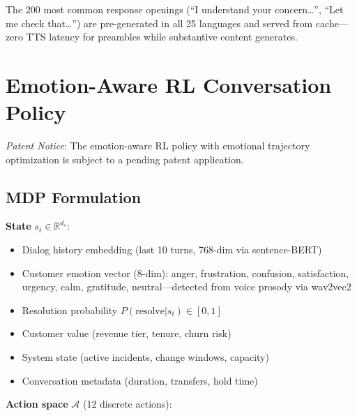 \documentclass[conference,10pt]{IEEEtran}
\begin{document}
The 200 most common response openings (``I understand your concern\ldots'', ``Let me check that\ldots'') are pre-generated in all 25 languages and served from cache---zero TTS latency for preambles while substantive content generates.

\section{Emotion-Aware RL Conversation Policy}
\label{sec:rl}

\emph{Patent Notice}: The emotion-aware RL policy with emotional trajectory optimization is subject to a pending patent application.

\subsection{MDP Formulation}

\textbf{State} $s_t \in \mathbb{R}^{d_s}$:
\begin{itemize}
\item Dialog history embedding (last 10 turns, 768-dim via sentence-BERT)
\item Customer emotion vector (8-dim): anger, frustration, confusion, satisfaction, urgency, calm, gratitude, neutral---detected from voice prosody via wav2vec2
\item Resolution probability $P(\text{resolve} | s_t) \in [0,1]$
\item Customer value (revenue tier, tenure, churn risk)
\item System state (active incidents, change windows, capacity)
\item Conversation metadata (duration, transfers, hold time)
\end{itemize}

\textbf{Action space} $\mathcal{A}$ (12 discrete actions):
\end{document}
